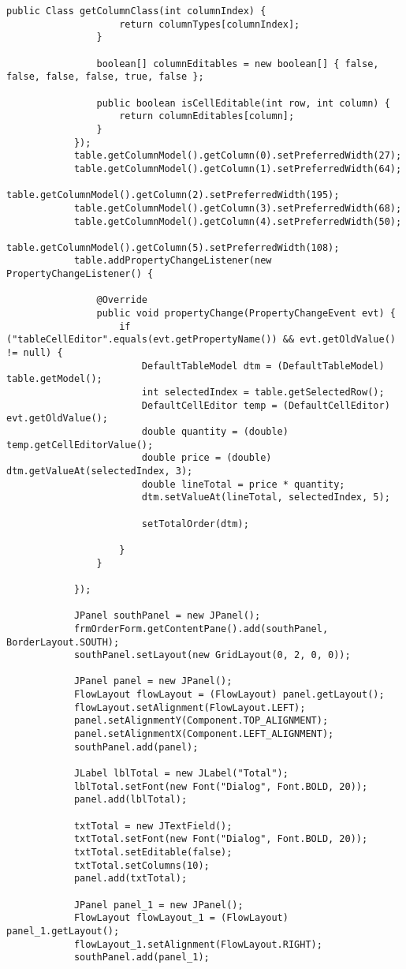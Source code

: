 \begin{lstlisting}[style=JavaStyle]
				public Class getColumnClass(int columnIndex) {
					return columnTypes[columnIndex];
				}
				
				boolean[] columnEditables = new boolean[] { false, false, false, false, true, false };
				
				public boolean isCellEditable(int row, int column) {
					return columnEditables[column];
				}
			});
			table.getColumnModel().getColumn(0).setPreferredWidth(27);
			table.getColumnModel().getColumn(1).setPreferredWidth(64);
			table.getColumnModel().getColumn(2).setPreferredWidth(195);
			table.getColumnModel().getColumn(3).setPreferredWidth(68);
			table.getColumnModel().getColumn(4).setPreferredWidth(50);
			table.getColumnModel().getColumn(5).setPreferredWidth(108);
			table.addPropertyChangeListener(new PropertyChangeListener() {
				
				@Override
				public void propertyChange(PropertyChangeEvent evt) {
					if ("tableCellEditor".equals(evt.getPropertyName()) && evt.getOldValue() != null) {
						DefaultTableModel dtm = (DefaultTableModel) table.getModel();
						int selectedIndex = table.getSelectedRow();
						DefaultCellEditor temp = (DefaultCellEditor) evt.getOldValue();
						double quantity = (double) temp.getCellEditorValue();
						double price = (double) dtm.getValueAt(selectedIndex, 3);
						double lineTotal = price * quantity;
						dtm.setValueAt(lineTotal, selectedIndex, 5);
						
						setTotalOrder(dtm);
						
					}
				}
				
			});
			
			JPanel southPanel = new JPanel();
			frmOrderForm.getContentPane().add(southPanel, BorderLayout.SOUTH);
			southPanel.setLayout(new GridLayout(0, 2, 0, 0));
			
			JPanel panel = new JPanel();
			FlowLayout flowLayout = (FlowLayout) panel.getLayout();
			flowLayout.setAlignment(FlowLayout.LEFT);
			panel.setAlignmentY(Component.TOP_ALIGNMENT);
			panel.setAlignmentX(Component.LEFT_ALIGNMENT);
			southPanel.add(panel);
			
			JLabel lblTotal = new JLabel("Total");
			lblTotal.setFont(new Font("Dialog", Font.BOLD, 20));
			panel.add(lblTotal);
			
			txtTotal = new JTextField();
			txtTotal.setFont(new Font("Dialog", Font.BOLD, 20));
			txtTotal.setEditable(false);
			txtTotal.setColumns(10);
			panel.add(txtTotal);
			
			JPanel panel_1 = new JPanel();
			FlowLayout flowLayout_1 = (FlowLayout) panel_1.getLayout();
			flowLayout_1.setAlignment(FlowLayout.RIGHT);
			southPanel.add(panel_1);
			

\end{lstlisting}
